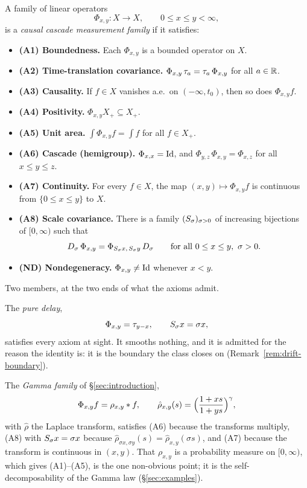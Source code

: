 \begin{definition}\label{def:cascade-family}
A family of linear operators
\[
  \Phi_{x,y} : X \to X, \qquad 0 \le x \le y < \infty,
\]
is a \emph{causal cascade measurement family} if it satisfies:
\begin{itemize}
\item \textbf{(A1) Boundedness.} Each $\Phi_{x,y}$ is a bounded operator on $X$.
\item \textbf{(A2) Time-translation covariance.} $\Phi_{x,y}\,\tau_a = \tau_a\,\Phi_{x,y}$
for all $a \in \mathbb{R}$.
\item \textbf{(A3) Causality.} If $f \in X$ vanishes a.e.\ on $(-\infty, t_0)$, then so does
$\Phi_{x,y} f$.
\item \textbf{(A4) Positivity.} $\Phi_{x,y} X_+ \subseteq X_+$.
\item \textbf{(A5) Unit area.} $\int \Phi_{x,y} f = \int f$ for all $f \in X_+$.
\item \textbf{(A6) Cascade (hemigroup).} $\Phi_{x,x} = \mathrm{Id}$, and
$\Phi_{y,z}\,\Phi_{x,y} = \Phi_{x,z}$ for all $x \le y \le z$.
\item \textbf{(A7) Continuity.} For every $f \in X$, the map $(x,y) \mapsto \Phi_{x,y} f$ is
continuous from $\{0 \le x \le y\}$ to $X$.
\item \textbf{(A8) Scale covariance.} There is a family $(S_\sigma)_{\sigma > 0}$ of
increasing bijections of $[0,\infty)$ such that
\[
  D_\sigma\,\Phi_{x,y} = \Phi_{S_\sigma x,\,S_\sigma y}\,D_\sigma
  \qquad \text{for all } 0 \le x \le y,\ \sigma > 0.
\]
\item \textbf{(ND) Nondegeneracy.} $\Phi_{x,y} \ne \mathrm{Id}$ whenever $x < y$.
\end{itemize}
\end{definition}

Two members, at the two ends of what the axioms admit.

The \emph{pure delay},
\[
  \Phi_{x,y} = \tau_{y-x}, \qquad S_\sigma x = \sigma x,
\]
satisfies every axiom at sight. It smooths nothing, and it is admitted for the reason the
identity is: it is the boundary the class closes on (Remark~\ref{rem:drift-boundary}).

The \emph{Gamma family} of \S\ref{sec:introduction},
\[
  \Phi_{x,y} f = \rho_{x,y} * f, \qquad
  \hat\rho_{x,y}(s) = \Bigl(\frac{1+xs}{1+ys}\Bigr)^{\gamma},
\]
with $\hat\rho$ the Laplace transform, satisfies (A6) because the transforms multiply,
(A8) with $S_\sigma x = \sigma x$ because
$\hat\rho_{\sigma x,\sigma y}(s) = \hat\rho_{x,y}(\sigma s)$, and (A7) because the
transform is continuous in $(x,y)$. That $\rho_{x,y}$ is a probability measure on
$[0,\infty)$, which gives (A1)--(A5), is the one non-obvious point; it is the
self-decomposability of the Gamma law (\S\ref{sec:examples}).

